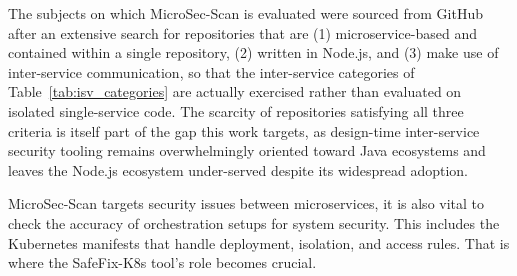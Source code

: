 \documentclass[preprint,12pt]{elsarticle}
\newcommand{\new}[1]{#1}
\begin{document}
\new{The subjects on which MicroSec-Scan is evaluated were sourced from
GitHub after an extensive search for repositories that are (1)
microservice-based and contained within a single repository, (2) written in
Node.js, and (3) make use of inter-service communication, so that the
inter-service categories of Table~\ref{tab:isv_categories} are actually
exercised rather than evaluated on isolated single-service code. The
scarcity of repositories satisfying all three criteria is itself part of
the gap this work targets, as design-time inter-service security tooling
remains overwhelmingly oriented toward Java ecosystems and leaves the
Node.js ecosystem under-served despite its widespread adoption.}

MicroSec-Scan targets security issues between microservices, \new{it is} also vital to check the accuracy of orchestration setups for system security. This includes the Kubernetes manifests that handle deployment, isolation, and access rules. That is where the SafeFix-K8s tool's role becomes crucial. 
\end{document}
